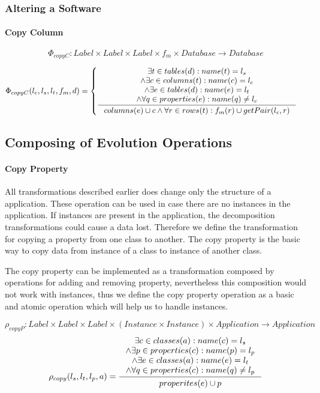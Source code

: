 \documentclass[11pt]{article}
\begin{document}
\subsubsection{Altering a Software}	
\paragraph{Copy Column}
$$\Phi_{copyC} : Label \times Label \times Label \times f_m \times Database \rightarrow Database $$

\begin{equation*}
	\begin{gathered}
		\Phi_{copyC}(l_c, l_s, l_t, f_m, d) = \begin{cases}
 		\inference{\exists t \in tables(d) : name(t) = l_s \\ \wedge \exists c \in columns(t) : name(c) = l_c \\ \wedge \exists e \in tables(d) : name(e) = l_t  \\ \wedge \forall q \in properties(e) : name(q) \neq l_c}{columns(e) \cup c \wedge \forall r \in rows(t) : f_m(r) \cup getPair(l_c,r)}
	\end{cases}
	\end{gathered}
\end{equation*}

\subsection{Composing of Evolution Operations}
\paragraph{Copy Property}
All transformations described earlier does change only the structure of a application. These operation can be used in case there are no instances in the application. If instances are present in the application, the decomposition transformations could cause a data lost. Therefore we define  the transformation for copying a property from one class to another. The copy property is the basic way to copy data from instance of a class to instance of another class.

The copy property can be implemented as a transformation composed by operations for adding and removing property, nevertheless this composition would not work with instances, thus we define the copy property operation as a basic and atomic operation which will help us to handle instances.

$$\rho_{copyP} : Label \times Label \times Label \times (Instance \times Instance) \times Application \rightarrow Application $$
\begin{equation*}
	\rho_{copy}(l_s, l_t, l_p, a) = \inference{\exists c \in classes(a) : name(c) = l_s \\ \wedge \exists p \in properties(c) : name(p) = l_p \\ \wedge \exists e \in classes(a) : name(e) = l_t  \\ \wedge \forall q \in properties(c) : name(q) \neq l_p}{\begin{gathered}
properites(e) \cup p 
\end{gathered}
}
\end{equation*}
\end{document}
